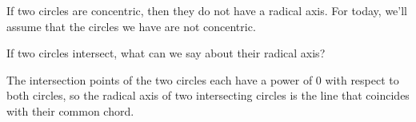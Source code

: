 




If two circles are concentric, then they do not have a radical axis. For today, we'll assume that the circles we have are not concentric.

If two circles intersect, what can we say about their radical axis?









The intersection points of the two circles each have a power of 0 with respect to both circles, so the radical axis of two intersecting circles is the line that coincides with their common chord.




